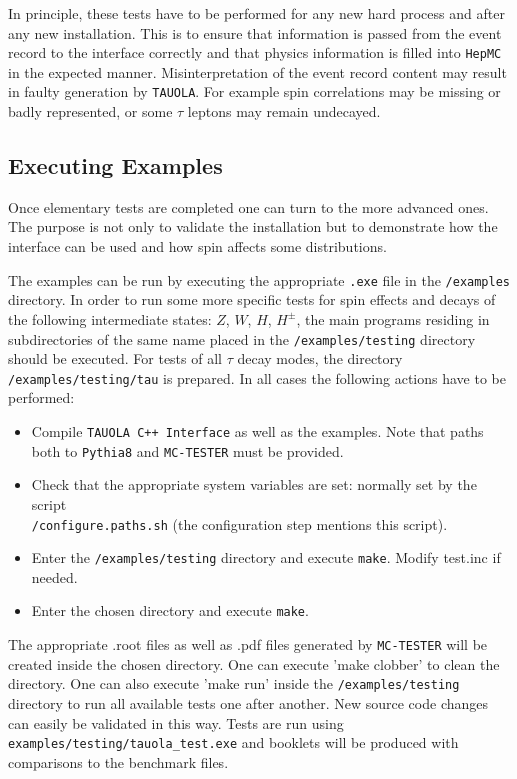 \documentclass[]{Tauola_interface_design}
\begin{document}
In principle, these tests have to be performed for any new hard 
process and after any new installation. This is to ensure that 
information is passed from the event record to the interface 
correctly and that physics information is filled into {\tt HepMC} 
in the expected manner. Misinterpretation of the event record content may result in 
faulty generation by {\tt TAUOLA}. For example spin correlations may be 
missing or badly represented, or some $\tau$ leptons may remain 
undecayed.


\subsection{Executing Examples}
\label{sec:Examples}
Once elementary tests are completed one can turn to the more advanced ones.
The purpose  is
not only to validate the installation but  to demonstrate how the
interface can be used and how spin affects some distributions.

The examples can be run  by executing the appropriate {\tt .exe} file in the {\tt /examples} directory.
In order to run some more specific tests for spin effects and decays of the following intermediate states:
 $Z$, $W$, $H$, $H^\pm$, the main programs residing in subdirectories of the same name placed in the {\tt /examples/testing} directory
should be executed. For tests of all $\tau$  decay modes, the directory {\tt /examples/testing/tau} is prepared.
In all cases the following actions have to be performed:

\begin{itemize}
  \item Compile {\tt TAUOLA C++ Interface} as well as the examples. Note that
        paths both to {\tt Pythia8} and {\tt MC-TESTER} must be provided.
 \item  Check that the appropriate system variables are set: normally set by the script \\
{\tt /configure.paths.sh} (the configuration step mentions this script).
  \item Enter the {\tt /examples/testing} directory and execute {\tt make}. Modify test.inc if needed.
  \item Enter the chosen directory and execute {\tt make}.
\end{itemize}

The appropriate .root files as well as .pdf files generated by {\tt MC-TESTER} will be created inside the chosen directory. 
One can execute 'make clobber' to clean the directory. 
One can also execute 'make run' inside the {\tt /examples/testing} directory to run all available tests one after another.
New source
code changes can easily be validated in this way.
Tests are run using {\tt examples/testing/tauola\_test.exe} 
and booklets will be produced with comparisons to the benchmark files.
\end{document}
